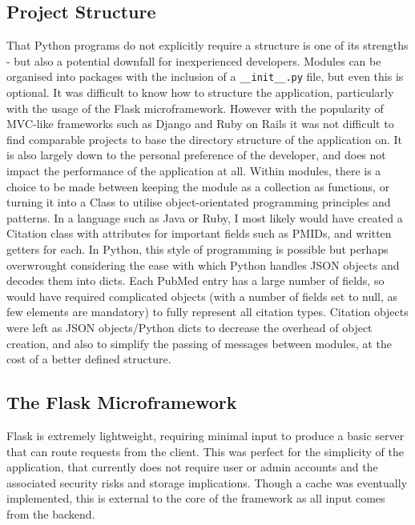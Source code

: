 \documentclass[Report.tex]{subfiles}
\begin{document}
\subsection{Project Structure}
\noindent That Python programs do not explicitly require a structure is one of its strengths - but also a potential downfall for inexperienced developers. Modules can be organised into packages with the inclusion of a \texttt{\_\_init\_\_.py} file, but even this is optional. It was difficult to know how to structure the application, particularly with the usage of the Flask microframework. However with the popularity of MVC-like frameworks such as Django and Ruby on Rails it was not difficult to find comparable projects to base the directory structure of the application on. It is also largely down to the personal preference of the developer, and does not impact the performance of the application at all. Within modules, there is a choice to be made between keeping the module as a collection as functions, or turning it into a Class to utilise object-orientated programming principles and patterns. In a language such as Java or Ruby, I most likely would have created a Citation class with attributes for important fields such as PMIDs, and written getters for each. In Python, this style of programming is possible but perhaps overwrought considering the ease with which Python handles JSON objects and decodes them into dicts. Each PubMed entry has a large number of fields, so would have required complicated objects (with a number of fields set to null, as few elements are mandatory) to fully represent all citation types. Citation objects were left as JSON objects/Python dicts to decrease the overhead of object creation, and also to simplify the passing of messages between modules, at the cost of a better defined structure. 

\subsection{The Flask Microframework}
 Flask is extremely lightweight, requiring minimal input to produce a basic server that can route requests from the client. This was perfect for the simplicity of the application, that currently does not require user or admin accounts and the associated security risks and storage implications. Though a cache was eventually implemented, this is external to the core of the framework as all input comes from the backend. 
\end{document}
